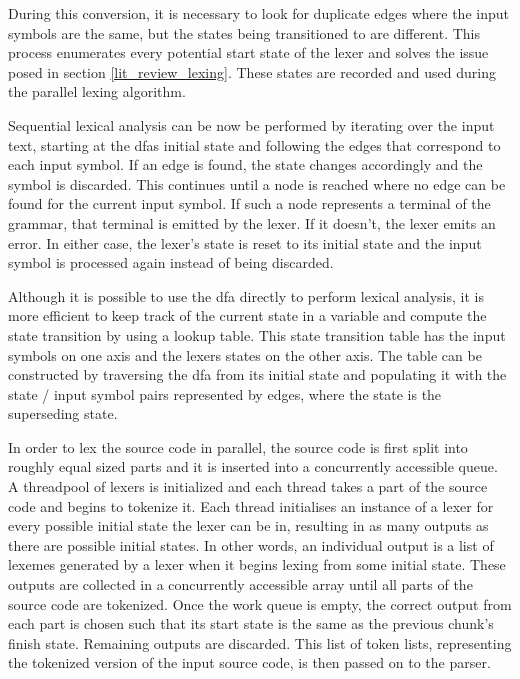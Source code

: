During this conversion, it is necessary to look for duplicate edges where the
input symbols are the same, but the states being transitioned to are different.
This process enumerates every potential start state of the lexer and solves the
issue posed in section \ref{lit_review_lexing}. These states are recorded and
used during the parallel lexing algorithm.

Sequential lexical analysis can be now be performed by iterating over the
input text, starting at the \glspl{dfa} initial state and following the edges
that correspond to each input symbol. If an edge is found, the state changes
accordingly and the symbol is discarded. This continues until a node is
reached where no edge can be found for the current input symbol. If such a node
represents a terminal of the grammar, that terminal is emitted by the lexer.
If it doesn't, the lexer emits an error. In either case, the lexer's state is
reset to its initial state and the input symbol is processed again instead of
being discarded.


Although it is possible to use the \gls{dfa} directly to perform lexical
analysis, it is more efficient to keep track of the current state in a variable
and compute the state transition by using a lookup table. This state transition
table has the input symbols on one axis and the lexers states on the other axis.
The table can be constructed by traversing the \gls{dfa} from its initial state
and populating it with the state / input symbol pairs represented by edges,
where the state is the superseding state.

In order to lex the source code in parallel, the source code is first split
into roughly equal sized parts and it is inserted into a concurrently accessible
queue. A threadpool of lexers is initialized and each thread takes a part of the
source code and begins to tokenize it. Each thread initialises an instance of
a lexer for every possible initial state the lexer can be in, resulting in as
many outputs as there are possible initial states. In other words, an individual
output is a list of lexemes generated by a lexer when it begins lexing from
some initial state. These outputs are collected in a concurrently accessible
array until all parts of the source code are tokenized. Once the work queue is
empty, the correct output from each part is chosen such that its start state is
the same as the previous chunk's finish state. Remaining outputs are discarded.
This list of token lists, representing the tokenized version of the input source
code, is then passed on to the parser.

